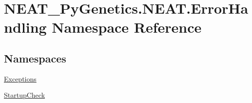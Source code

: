 \hypertarget{namespaceNEAT__PyGenetics_1_1NEAT_1_1ErrorHandling}{}\section{N\+E\+A\+T\+\_\+\+Py\+Genetics.\+N\+E\+A\+T.\+Error\+Handling Namespace Reference}
\label{namespaceNEAT__PyGenetics_1_1NEAT_1_1ErrorHandling}
\subsection*{Namespaces}
\begin{DoxyCompactItemize}
\item 
 \hyperlink{namespaceNEAT__PyGenetics_1_1NEAT_1_1ErrorHandling_1_1Exceptions}{Exceptions}
\item 
 \hyperlink{namespaceNEAT__PyGenetics_1_1NEAT_1_1ErrorHandling_1_1StartupCheck}{Startup\+Check}
\end{DoxyCompactItemize}
